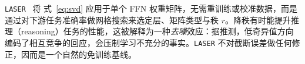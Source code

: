 \documentclass[11pt]{article}
\begin{document}
\begin{mainpart}


\texttt{LASER}~\citep{LASER_2024} 将
式~\ref{eq:svd} 应用于单个 FFN 权重矩阵，无需重训练或校准数据，而是通过对下游任务准确率做网格搜索来选定层、矩阵类型与秩 $r$。降秩有时能提升推理（reasoning）任务的性能，这被解释为一种\emph{去噪}效应：据推测，低奇异值方向编码了相互竞争的回应，会压制学习不充分的事实。\texttt{LASER} 不对截断误差做任何修正，因而是一个自然的免训练基线。



\end{mainpart}
\end{document}
